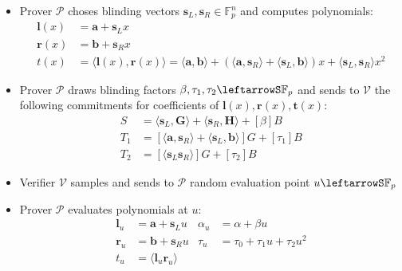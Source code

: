 \documentclass[../lecture-notes-148x210.tex]{subfiles}
\begin{document}
\begin{definition}
    \begin{itemize}
        \item Prover $\mathcal{P}$ choses blinding vectors $\mathbf{s}_L, \mathbf{s}_R \in \mathbb{F}_p^n$ and computes polynomials:
            \begin{align*}
                \mathbf{l}(x) &= \mathbf{a} + \mathbf{s}_L x \\
                \mathbf{r}(x) &= \mathbf{b} + \mathbf{s}_R x \\
                t(x) &= \langle \mathbf{l}(x), \mathbf{r}(x) \rangle = \langle \mathbf{a}, \mathbf{b} \rangle + (\langle \mathbf{a}, \mathbf{s}_R \rangle + \langle \mathbf{s}_L, \mathbf{b} \rangle) x + \langle \mathbf{s}_L, \mathbf{s}_R \rangle x^2
            \end{align*}
        \item Prover $\mathcal{P}$ draws blinding factors $\beta, \tau_1, \tau_2 \leftarrowS \mathbb{F}_p$ and sends to $\mathcal{V}$ the following commitments for coefficients of $\mathbf{l}(x), \mathbf{r}(x), \mathbf{t}(x)$:
            \begin{equation}
                \begin{aligned}
                    S &= \langle \mathbf{s}_L, \mathbf{G} \rangle + \langle \mathbf{s}_R, \mathbf{H} \rangle + [\beta]B\\
                    T_1 &= [\langle \mathbf{a}, \mathbf{s}_R \rangle + \langle \mathbf{s}_L, \mathbf{b} \rangle]G + [\tau_1]B \\
                    T_2 &= [\langle \mathbf{s}_L \mathbf{s}_R \rangle]G + [\tau_2]B
                \end{aligned}
            \end{equation}
        \item Verifier $\mathcal{V}$ samples and sends to $\mathcal{P}$ random evaluation point $u \leftarrowS \mathbb{F}_p$
        \item Prover $\mathcal{P}$ evaluates polynomials at $u$:
            \begin{equation}
                \begin{aligned}
                    \mathbf{l}_u & = \mathbf{a} + \mathbf{s}_L u & \alpha_u &= \alpha + \beta u\\
                    \mathbf{r}_u &= \mathbf{b} + \mathbf{s}_R u & \tau_u &= \tau_0 + \tau_1 u + \tau_2 u^2\\
                    t_u &= \langle \mathbf{l}_u \mathbf{r}_u \rangle & 
                \end{aligned}

\end{equation}
\end{itemize}
\end{definition}
\end{document}
